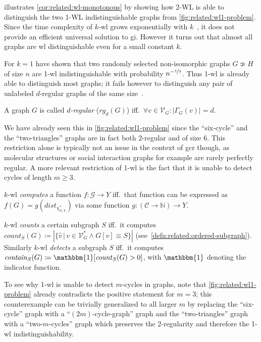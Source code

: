  illustrates \cref{cor:related:wl-monotonous} by showing how 2-WL is able to distinguish the two 1-WL indistinguishable graphs from \cref{fig:related:wl1-problem}.
Since the time complexity of $k$-\acs{wl} grows exponentially with $k$~\cite[cor.~1.9.7]{Immerman1990}, it does not provide an efficient universal solution to \ac{gi}.
However it turns out that almost all graphs are \ac{wl} distinguishable even for a small constant $k$.

For $k = 1$ \citet{Babai1980} have shown that two randomly selected non-isomorphic graphs $G \not\simeq H$ of size $n$ are 1-\acs{wl} indistinguishable with probability $n^{-\nicefrac{1}{7}}$.
Thus 1-\acs{wl} is already able to distinguish most graphs; it fails however to distinguish any pair of unlabeled $d$-regular graphs of the same size~\cite[cor.~1.8.5]{Immerman1990}.
\begin{defn}
	A graph $G$ is called \textit{$d$-regular} ($\mathit{rg}_d(G)$) iff.\ $\forall v \in \mathcal{V}_G: {|\Gamma_G(v)|} = d$.
\end{defn}
We have already seen this in \cref{fig:related:wl1-problem} since the ``six-cycle'' and the ``two-triangles'' graphs are in fact both 2-regular and of size 6.
This restriction alone is typically not an issue in the context of \ac{gcr} though, as molecular structures or social interaction graphs for example are rarely perfectly regular.
A more relevant restriction of 1-\acs{wl} is the fact that it is unable to detect cycles of length $m \geq 3$.
\begin{defn}\label{defn:related:wl-compute}
	$k$-\acs{wl} \textit{computes} a function $f: \mathcal{G} \to Y$ iff.\ that function can be expressed as $f(G) = g(\mathit{dist}_{\chi_{G, k}^{*}})$ via some function $g: (\mathcal{C} \to \mathbb{N}) \to Y$.
\end{defn}
\begin{defn}\label{defn:related:wl-count-detect}
	$k$-\acs{wl} \textit{counts} a certain subgraph $S$ iff.\ it computes $\mathit{count}_S(G) \coloneqq \left|\{ \hat{v}\, |\, v \in \mathcal{V}_G^{*} \land G[v] \equiv S \}\right|$ (see~\cref{defn:related:ordered-subgraph}).
	Similarly $k$-\acs{wl} \textit{detects} a subgraph $S$ iff.\ it computes $\mathit{contain}_S(G) \coloneqq \mathbbm{1}[\mathit{count}_S(G) > 0]$, with $\mathbbm{1}$ denoting the indicator function.
\end{defn}
To see why 1-\acs{wl} is unable to detect $m$-cycles in graphs, note that \cref{fig:related:wl1-problem} already contradicts the positive statement for $m = 3$;
this counterexample can be trivially generalized to all larger $m$ by replacing the ``six-cycle'' graph with a ``$(2m)$-cycle-graph'' graph and the ``two-triangles'' graph with a ``two-$m$-cycles'' graph which preserves the 2-regularity and therefore the 1-\acs{wl} indistinguishability.


